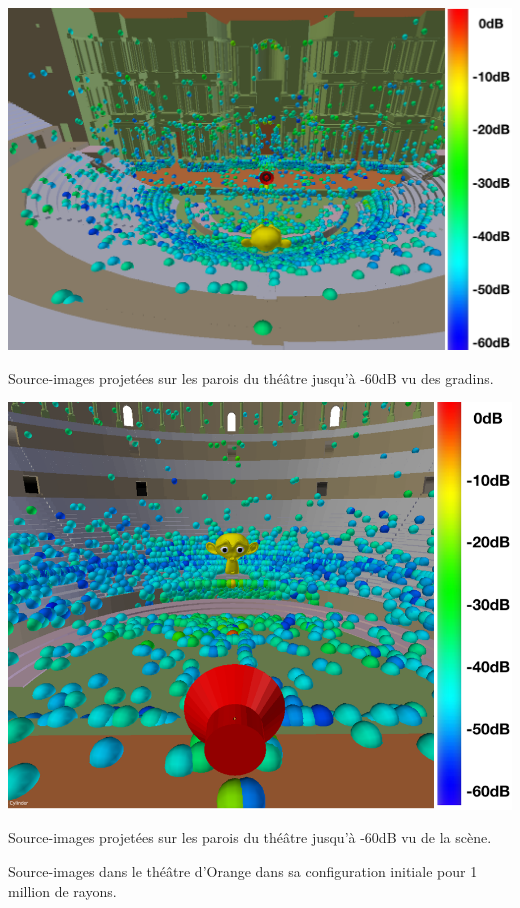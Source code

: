 \begin{figureth}
	\begin{subfigureth}{0.8\textwidth}
		\includegraphics[width=\linewidth]{images/SI60dB}
		\caption{Source-images projetées sur les parois du théâtre jusqu'à -60dB vu des gradins.}
		\label{SI60dB}
		\hfill
		\quad
	\end{subfigureth}
	
	\begin{subfigureth}{0.8\textwidth}
		\includegraphics[width=\linewidth]{images/SI60dBbis}
		\caption{Source-images projetées sur les parois du théâtre jusqu'à -60dB vu de la scène.}
		\label{SI60dBbis}
		\quad
	\end{subfigureth} 
\caption{Source-images dans le théâtre d'Orange dans sa configuration initiale pour 1 million de rayons.}	
\label{SITheatre60}
\end{figureth}
